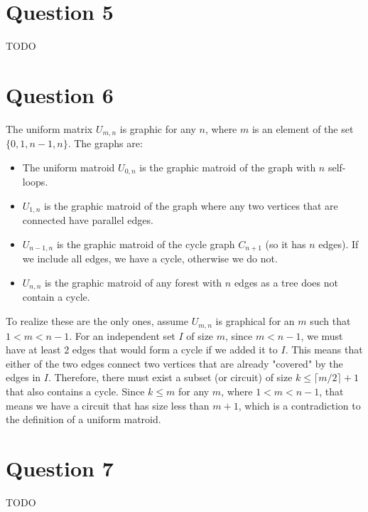\documentclass[a4paper, fleqn]{article}
\begin{document}
\section*{Question 5}
TODO

\section*{Question 6}
The uniform matrix $U_{m,n}$ is graphic for any $n$, where $m$ is an element of the set $\{0,1,n-1, n\}$. The graphs are:
\begin{itemize}
  \item The uniform matroid $U_{0,n}$ is the graphic matroid of the graph with $n$ self-loops.
  \item $U_{1,n}$ is the graphic matroid of the graph where any two vertices that are connected have parallel edges.
  \item $U_{n-1, n}$ is the graphic matroid of the cycle graph $C_{n+1}$ (so it has $n$ edges). If we include all edges, we have a cycle, otherwise we do not.
  \item $U_{n,n}$ is the graphic matroid of any forest with $n$ edges as a tree does not contain a cycle.
\end{itemize}
To realize these are the only ones, assume $U_{m,n}$ is graphical for an $m$ such that $1<m<n-1$. For an independent set $I$ of size $m$, since $m<n-1$, we must have at least $2$ edges that would form a cycle if we added it to $I$. This means that either of the two edges connect two vertices that are already "covered" by the edges in $I$. Therefore, there must exist a subset (or circuit) of size $k\leq \lceil m/2\rceil +1$ that also contains a cycle. Since $k \leq m$ for any $m$, where $1<m<n-1$, that means we have a circuit that has size less than $m+1$, which is a contradiction to the definition of a uniform matroid.

\section*{Question 7}
TODO
\end{document}
